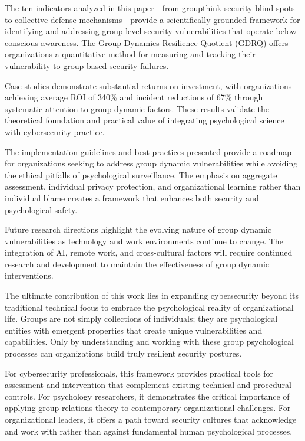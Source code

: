\documentclass[11pt,a4paper]{article}
\begin{document}
The ten indicators analyzed in this paper—from groupthink security blind spots to collective defense mechanisms—provide a scientifically grounded framework for identifying and addressing group-level security vulnerabilities that operate below conscious awareness. The Group Dynamics Resilience Quotient (GDRQ) offers organizations a quantitative method for measuring and tracking their vulnerability to group-based security failures.

Case studies demonstrate substantial returns on investment, with organizations achieving average ROI of 340\% and incident reductions of 67\% through systematic attention to group dynamic factors. These results validate the theoretical foundation and practical value of integrating psychological science with cybersecurity practice.

The implementation guidelines and best practices presented provide a roadmap for organizations seeking to address group dynamic vulnerabilities while avoiding the ethical pitfalls of psychological surveillance. The emphasis on aggregate assessment, individual privacy protection, and organizational learning rather than individual blame creates a framework that enhances both security and psychological safety.

Future research directions highlight the evolving nature of group dynamic vulnerabilities as technology and work environments continue to change. The integration of AI, remote work, and cross-cultural factors will require continued research and development to maintain the effectiveness of group dynamic interventions.

The ultimate contribution of this work lies in expanding cybersecurity beyond its traditional technical focus to embrace the psychological reality of organizational life. Groups are not simply collections of individuals; they are psychological entities with emergent properties that create unique vulnerabilities and capabilities. Only by understanding and working with these group psychological processes can organizations build truly resilient security postures.

For cybersecurity professionals, this framework provides practical tools for assessment and intervention that complement existing technical and procedural controls. For psychology researchers, it demonstrates the critical importance of applying group relations theory to contemporary organizational challenges. For organizational leaders, it offers a path toward security cultures that acknowledge and work with rather than against fundamental human psychological processes.
\end{document}

